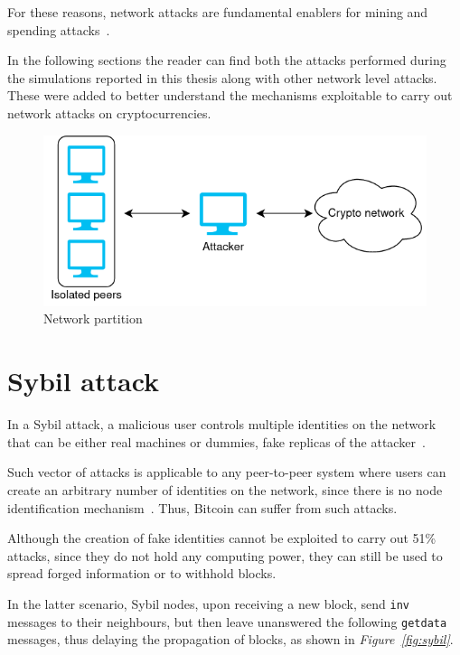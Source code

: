 For these reasons, network attacks are fundamental enablers for mining and spending attacks~\cite{dotan2020surveychallenges}.\par

In the following sections the reader can find both the attacks performed during the simulations reported in this thesis along with other network level attacks. These were added to better understand the mechanisms exploitable to carry out network attacks on cryptocurrencies.

\begin{figure}[h!]
	\includegraphics[width=.55\textwidth]{pict/network-partition.png}
	\centering
	\caption{Network partition}
	\label{fig:net-part}
\end{figure}


\section{Sybil attack}\label{sec:sybil}
In a Sybil attack, a malicious user controls multiple identities on the network that can be either real machines or dummies, fake replicas of the attacker~\cite{douceur2002sybil}.

Such vector of attacks is applicable to any peer-to-peer system where users can create an arbitrary number of identities on the network, since there is no node identification mechanism~\cite{kedziora-sybil-ledgers}. Thus, Bitcoin can suffer from such attacks.

Although the creation of fake identities cannot be exploited to carry out 51\% attacks, since they do not hold any computing power, they can still be used to spread forged information or to withhold blocks.

In the latter scenario, Sybil nodes, upon receiving a new block, send \texttt{inv} messages to their neighbours, but then leave unanswered the following \texttt{getdata} messages, thus delaying the propagation of blocks, as shown in \emph{Figure~\ref{fig:sybil}}.

